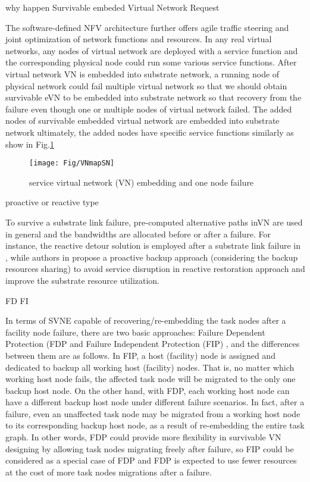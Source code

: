 why happen Survivable embeded Virtual Network Request

The software-defined NFV architecture further offers agile traffic steering and joint optimization of network functions and resources.
In any real virtual networks, any nodes of virtual network  are deployed with a service function and the corresponding physical node could run some various service functions. After virtual network VN is embedded into substrate network, a running node of physical network could fail multiple virtual network so that we should obtain survivable eVN to be embedded into substrate network so that recovery from the failure even though one or multiple nodes of virtual network failed. The added nodes of survivable embedded virtual network are embedded into substrate network ultimately, the added nodes have specific service functions similarly as show in Fig.\ref{fig:VNmapSN}

\begin{figure}
  \centering
  \texttt{[image: Fig/VNmapSN]}\\
  \caption{service virtual network (VN) embedding and one node failure}\label{fig:VNmapSN}
\end{figure}

proactive or reactive type

To survive a substrate link failure, pre-computed alternative paths inVN are used in general and the bandwidths are allocated before or after a failure. For instance, the reactive detour solution is employed after a substrate link failure in \cite{rahman2010survivable}, while authors in \cite{rahman2013svne,guo2011shared} propose a proactive backup approach (considering the backup resources sharing) to avoid service disruption in reactive restoration approach and improve the substrate resource utilization.


FD  FI

In terms of SVNE capable of recovering/re-embedding the task nodes after a facility node failure, there are two basic approaches: Failure Dependent Protection (FDP \cite{yu2010survivable} and Failure Independent Protection (FIP) \cite{yeow2011designing}, and the differences between them are as follows. In FIP, a host (facility) node is assigned and dedicated to backup all working host (facility) nodes. That is, no matter which working host node fails, the affected task node will be migrated to the only one backup host node. On the other hand, with FDP, each working host node can have a different backup host node under different failure scenarios. In fact, after a failure, even an unaffected task node may be migrated from a working host node to its corresponding backup host node, as a result of re-embedding the entire task graph. In other words, FDP could provide more flexibility in survivable VN designing by allowing task nodes migrating freely after failure, so FIP could be considered as a special case of FDP and FDP is expected to use fewer resources at the cost of more task nodes migrations after a failure.



